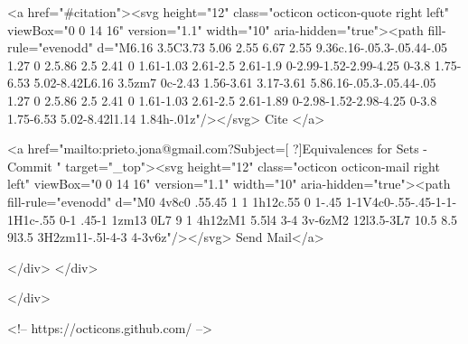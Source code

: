       <a  href="#citation"><svg height="12" class="octicon octicon-quote right left" viewBox="0 0 14 16" version="1.1" width="10" aria-hidden="true"><path fill-rule="evenodd" d="M6.16 3.5C3.73 5.06 2.55 6.67 2.55 9.36c.16-.05.3-.05.44-.05 1.27 0 2.5.86 2.5 2.41 0 1.61-1.03 2.61-2.5 2.61-1.9 0-2.99-1.52-2.99-4.25 0-3.8 1.75-6.53 5.02-8.42L6.16 3.5zm7 0c-2.43 1.56-3.61 3.17-3.61 5.86.16-.05.3-.05.44-.05 1.27 0 2.5.86 2.5 2.41 0 1.61-1.03 2.61-2.5 2.61-1.89 0-2.98-1.52-2.98-4.25 0-3.8 1.75-6.53 5.02-8.42l1.14 1.84h-.01z"/></svg> Cite
      </a>

      <a href="mailto:prieto.jona@gmail.com?Subject=[ ?]Equivalences for Sets - Commit " target="_top"><svg height="12" class="octicon octicon-mail right left" viewBox="0 0 14 16" version="1.1" width="10" aria-hidden="true"><path fill-rule="evenodd" d="M0 4v8c0 .55.45 1 1 1h12c.55 0 1-.45 1-1V4c0-.55-.45-1-1-1H1c-.55 0-1 .45-1 1zm13 0L7 9 1 4h12zM1 5.5l4 3-4 3v-6zM2 12l3.5-3L7 10.5 8.5 9l3.5 3H2zm11-.5l-4-3 4-3v6z"/></svg> Send Mail</a>

    </div>
  </div>

</div>

<!-- https://octicons.github.com/ -->





